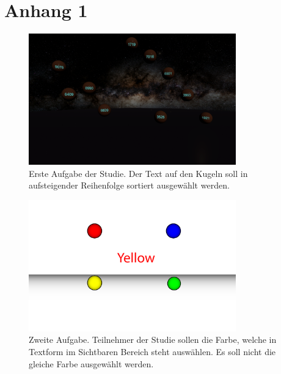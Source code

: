 \chapter{Anhang 1}

\begin{figure}
	\centering
	\includegraphics[width=0.8\textwidth]{./images/ordering.png}
	\caption{Erste Aufgabe der Studie. Der Text auf den Kugeln soll in aufsteigender Reihenfolge sortiert ausgewählt werden.}
	\label{fig:ordeing}
\end{figure}

\begin{figure}
	\centering
	\includegraphics[width=0.8\textwidth]{./images/matching_abstract.png}
	\caption{Zweite Aufgabe. Teilnehmer der Studie sollen die Farbe, welche in Textform im Sichtbaren Bereich steht auswählen. Es soll nicht die gleiche Farbe ausgewählt werden.}
	\label{fig:matching}
\end{figure}

